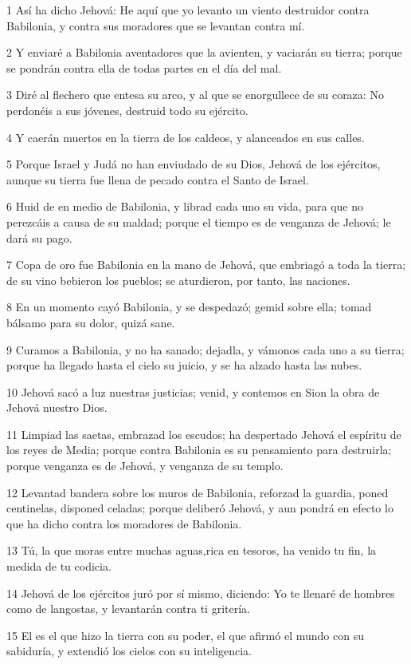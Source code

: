 \par 1 Así ha dicho Jehová: He aquí que yo levanto un viento destruidor contra Babilonia, y contra sus moradores que se levantan contra mí.
\par 2 Y enviaré a Babilonia aventadores que la avienten, y vaciarán su tierra; porque se pondrán contra ella de todas partes en el día del mal.
\par 3 Diré al flechero que entesa su arco, y al que se enorgullece de su coraza: No perdonéis a sus jóvenes, destruid todo su ejército.
\par 4 Y caerán muertos en la tierra de los caldeos, y alanceados en sus calles.
\par 5 Porque Israel y Judá no han enviudado de su Dios, Jehová de los ejércitos, aunque su tierra fue llena de pecado contra el Santo de Israel.
\par 6 Huid de en medio de Babilonia, y librad cada uno su vida, para que no perezcáis a causa de su maldad; porque el tiempo es de venganza de Jehová; le dará su pago.
\par 7 Copa de oro fue Babilonia en la mano de Jehová, que embriagó a toda la tierra; de su vino bebieron los pueblos; se aturdieron, por tanto, las naciones.
\par 8 En un momento cayó Babilonia, y se despedazó; gemid sobre ella; tomad bálsamo para su dolor, quizá sane.
\par 9 Curamos a Babilonia, y no ha sanado; dejadla, y vámonos cada uno a su tierra; porque ha llegado hasta el cielo su juicio, y se ha alzado hasta las nubes.
\par 10 Jehová sacó a luz nuestras justicias; venid, y contemos en Sion la obra de Jehová nuestro Dios.
\par 11 Limpiad las saetas, embrazad los escudos; ha despertado Jehová el espíritu de los reyes de Media; porque contra Babilonia es su pensamiento para destruirla; porque venganza es de Jehová, y venganza de su templo.
\par 12 Levantad bandera sobre los muros de Babilonia, reforzad la guardia, poned centinelas, disponed celadas; porque deliberó Jehová, y aun pondrá en efecto lo que ha dicho contra los moradores de Babilonia.
\par 13 Tú, la que moras entre muchas aguas,rica en tesoros, ha venido tu fin, la medida de tu codicia.
\par 14 Jehová de los ejércitos juró por sí mismo, diciendo: Yo te llenaré de hombres como de langostas, y levantarán contra ti gritería.
\par 15 El es el que hizo la tierra con su poder, el que afirmó el mundo con su sabiduría, y extendió los cielos con su inteligencia.
